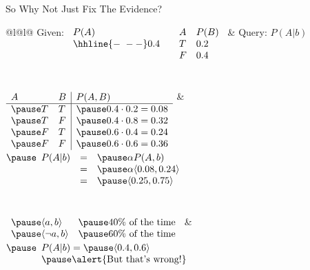 \documentclass[12pt]{beamer}
\begin{document}
\begin{frame}{So Why Not Just Fix The Evidence?}
	\begin{tabular}{@{}l@{\hspace{1.5em}}l@{}}
		Given:
		$
		\begin{array}[t]{llll}
			P(A) & & A & P(B) \\
			\hhline{-~--}
			0.4  & & T & 0.2 \\
			     & & F & 0.4 \\
		\end{array}
		$
		&
		Query: $P(A|b)$
		\\
		\\
		\\
		$
		\begin{array}[t]{ll|l}
			A & B & P(A,B) \\
			\hline
			\pause T & T & \pause 0.4 \cdot 0.2 = 0.08 \\
			\pause T & F & \pause 0.4 \cdot 0.8 = 0.32 \\
			\pause F & T & \pause 0.6 \cdot 0.4 = 0.24 \\
			\pause F & F & \pause 0.6 \cdot 0.6 = 0.36 \\
		\end{array}
		$
		&
		$
		\pause
		\begin{array}[t]{lll}
			P(A|b) & = & \pause \alpha P(A, b) \\
			       & = & \pause \alpha \langle 0.08, 0.24 \rangle \\
			       & = & \pause \langle 0.25, 0.75 \rangle
		\end{array}
		$
		\\
		\\
		\\
		$
		\begin{array}[t]{ll}
			\pause\langle a, b \rangle       & \pause\mbox{40\% of the time} \\
			\pause\langle \lnot a, b \rangle & \pause\mbox{60\% of the time} \\
		\end{array}
		$
		&
		$
		\pause
		\begin{array}[t]{l}
			P(A|b) = \pause\langle 0.4, 0.6 \rangle \\
			\pause\mbox{\alert{But that's wrong!}}
		\end{array}
		$
	\end{tabular}
\end{frame}
\end{document}
